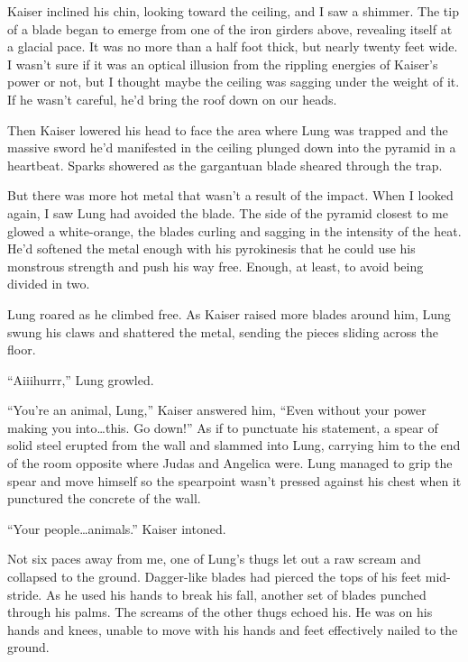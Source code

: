 Kaiser inclined his chin, looking toward the ceiling, and I saw a shimmer.  The tip of a blade began to emerge from one of the iron girders above, revealing itself at a glacial pace.  It was no more than a half foot thick, but nearly twenty feet wide.  I wasn't sure if it was an optical illusion from the rippling energies of Kaiser's power or not, but I thought maybe the ceiling was sagging under the weight of it.  If he wasn't careful, he'd bring the roof down on our heads.



Then Kaiser lowered his head to face the area where Lung was trapped and the massive sword he'd manifested in the ceiling plunged down into the pyramid in a heartbeat.  Sparks showered as the gargantuan blade sheared through the trap.



But there was more hot metal that wasn't a result of the impact.  When I looked again, I saw Lung had avoided the blade.  The side of the pyramid closest to me glowed a white-orange, the blades curling and sagging in the intensity of the heat.  He'd softened the metal enough with his pyrokinesis that he could use his monstrous strength and push his way free.  Enough, at least, to avoid being divided in two.



Lung roared as he climbed free.  As Kaiser raised more blades around him, Lung swung his claws and shattered the metal, sending the pieces sliding across the floor.



``Aiiihurrr,'' Lung growled.



``You're an animal, Lung,'' Kaiser answered him, ``Even without your power making you into\ldots this.  Go down!''  As if to punctuate his statement, a spear of solid steel erupted from the wall and slammed into Lung, carrying him to the end of the room opposite where Judas and Angelica were.  Lung managed to grip the spear and move himself so the spearpoint wasn't pressed against his chest when it punctured the concrete of the wall.



``Your people\ldots animals.''  Kaiser intoned.



Not six paces away from me, one of Lung's thugs let out a raw scream and collapsed to the ground.  Dagger-like blades had pierced the tops of his feet mid-stride.  As he used his hands to break his fall, another set of blades punched through his palms.  The screams of the other thugs echoed his.  He was on his hands and knees, unable to move with his hands and feet effectively nailed to the ground.



